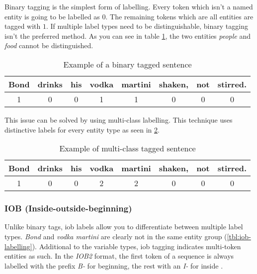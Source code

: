 Binary tagging is the simplest form of labelling. Every token which isn't a named entity is going to be labelled as $0$. The remaining
tokens which are all entities are tagged with $1$. If multiple label types need to be distinguishable, binary tagging isn't the preferred
method. As you can see in table \ref{tbl:binary-labelling}, the two entities \emph{people} and \emph{food} cannot be distinguished.

\begin{table}[h!]
    \centering
    \begin{tabular}{|c|c|c|c|c|c|c|c|}
        \hline
        Bond & drinks & his & vodka & martini & shaken, & not & stirred. \\
        \hline
        1 & 0 & 0 & 1 & 1 & 0 & 0 & 0 \\
        \hline
    \end{tabular}
    \caption{Example of a binary tagged sentence}
    \label{tbl:binary-labelling}
\end{table}

This issue can be solved by using multi-class labelling. This technique uses distinctive labels for every entity type as seen in
\ref{tbl:multiclass-labelling}.

\begin{table}[h!]
    \centering
    \begin{tabular}{|c|c|c|c|c|c|c|c|}
        \hline
        Bond & drinks & his & vodka & martini & shaken, & not & stirred. \\
        \hline
        1 & 0 & 0 & 2 & 2 & 0 & 0 & 0 \\
        \hline
    \end{tabular}
    \caption{Example of multi-class tagged sentence}
    \label{tbl:multiclass-labelling}
\end{table}

\subsubsection{IOB (Inside-outside-beginning)}

Unlike binary tags, \acrshort{iob} labels allow you to differentiate between multiple label types. \emph{Bond} and \emph{vodka martini}
are clearly not in the same entity group (\ref{tbl:iob-labelling}). Additional to the variable types, \acrshort{iob} tagging indicates
multi-token entities as such. In the \emph{IOB2} format, the first token of a sequence is always labelled with the prefix \emph{B-} for
beginning, the rest with an \emph{I-} for inside \cite{bio95}.

